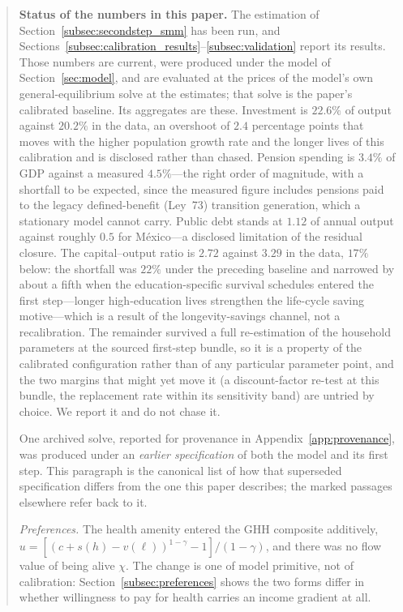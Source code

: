 \documentclass[12pt,a4paper]{article}
\begin{document}
\begin{quote}
\small\noindent\textbf{Status of the numbers in this paper.}
\label{par:superseded}
The estimation of Section~\ref{subsec:secondstep_smm} has been run, and Sections~\ref{subsec:calibration_results}--\ref{subsec:validation} report its results. Those numbers are current, were produced under the model of Section~\ref{sec:model}, and are evaluated at the prices of the model's own general-equilibrium solve at the estimates; that solve is the paper's calibrated baseline. Its aggregates are these. Investment is $22.6\%$ of output against $20.2\%$ in the data, an overshoot of $2.4$ percentage points that moves with the higher population growth rate and the longer lives of this calibration and is disclosed rather than chased. Pension spending is $3.4\%$ of GDP against a measured $4.5\%$---the right order of magnitude, with a shortfall to be expected, since the measured figure includes pensions paid to the legacy defined-benefit (Ley~73) transition generation, which a stationary model cannot carry. Public debt stands at $1.12$ of annual output against roughly $0.5$ for M\'exico---a disclosed limitation of the residual closure. The capital--output ratio is $2.72$ against $3.29$ in the data, $17\%$ below: the shortfall was $22\%$ under the preceding baseline and narrowed by about a fifth when the education-specific survival schedules entered the first step---longer high-education lives strengthen the life-cycle saving motive---which is a result of the longevity-savings channel, not a recalibration. The remainder survived a full re-estimation of the household parameters at the sourced first-step bundle, so it is a property of the calibrated configuration rather than of any particular parameter point, and the two margins that might yet move it (a discount-factor re-test at this bundle, the replacement rate within its sensitivity band) are untried by choice. We report it and do not chase it.

One archived solve, reported for provenance in Appendix~\ref{app:provenance}, was produced under an \emph{earlier specification} of both the model and its first step. This paragraph is the canonical list of how that superseded specification differs from the one this paper describes; the marked passages elsewhere refer back to it.

\emph{Preferences.} The health amenity entered the GHH composite additively, $u=[(c+s(h)-v(\ell))^{1-\gamma}-1]/(1-\gamma)$, and there was no flow value of being alive $\chi$. The change is one of model primitive, not of calibration: Section~\ref{subsec:preferences} shows the two forms differ in whether willingness to pay for health carries an income gradient at all.


\end{quote}
\end{document}
